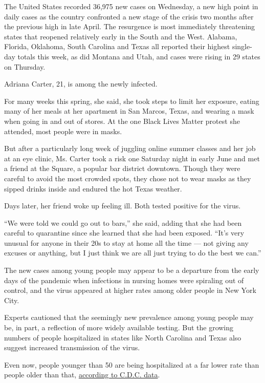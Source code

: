 The United States recorded 36,975 new cases on Wednesday, a new high
point in daily cases as the country confronted a new stage of the crisis
two months after the previous high in late April. The resurgence is most
immediately threatening states that reopened relatively early in the
South and the West. Alabama, Florida, Oklahoma, South Carolina and Texas
all reported their highest single-day totals this week, as did Montana
and Utah, and cases were rising in 29 states on Thursday.

Adriana Carter, 21, is among the newly infected.

For many weeks this spring, she said, she took steps to limit her
exposure, eating many of her meals at her apartment in San Marcos,
Texas, and wearing a mask when going in and out of stores. At the one
Black Lives Matter protest she attended, most people were in masks.

But after a particularly long week of juggling online summer classes and
her job at an eye clinic, Ms. Carter took a risk one Saturday night in
early June and met a friend at the Square, a popular bar district
downtown. Though they were careful to avoid the most crowded spots, they
chose not to wear masks as they sipped drinks inside and endured the hot
Texas weather.

Days later, her friend woke up feeling ill. Both tested positive for the
virus.

``We were told we could go out to bars,'' she said, adding that she had
been careful to quarantine since she learned that she had been exposed.
``It's very unusual for anyone in their 20s to stay at home all the time
--- not giving any excuses or anything, but I just think we are all just
trying to do the best we can.''

The new cases among young people may appear to be a departure from the
early days of the pandemic when infections in nursing homes were
spiraling out of control, and the virus appeared at higher rates among
older people in New York City.

Experts cautioned that the seemingly new prevalence among young people
may be, in part, a reflection of more widely available testing. But the
growing numbers of people hospitalized in states like North Carolina and
Texas also suggest increased transmission of the virus.

Even now, people younger than 50 are being hospitalized at a far lower
rate than people older than that,
\href{https://www.cdc.gov/coronavirus/2019-ncov/covid-data/covidview/index.html}{according
to C.D.C. data}.


